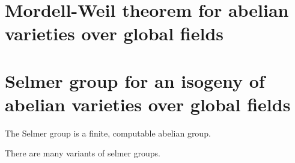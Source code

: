 \section{Mordell-Weil theorem for abelian varieties over global fields}



\section{Selmer group for an isogeny of abelian varieties over global fields}













The Selmer group is a finite, computable abelian group. %

\begin{remark}
There are many variants of selmer groups. 
\end{remark}




